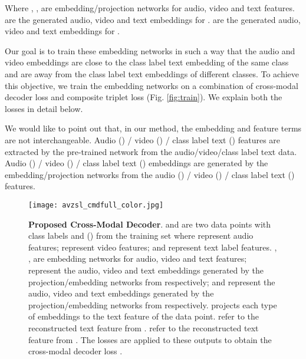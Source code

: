 \documentclass[10pt,twocolumn,letterpaper]{article}
\begin{document}
Where , ,  are embedding/projection networks for audio, video and text features.  are the generated audio, video and text embeddings for .  are the generated audio, video and text embeddings for .

Our goal is to train these embedding networks in such a way that the audio and video embeddings are close to the class label text embedding of the same class and are away from the class label text embeddings of different classes. To achieve this objective, we train the embedding networks on a combination of cross-modal decoder loss and composite triplet loss (Fig. \ref{fig:train}). We explain both the losses in detail below.

We would like to point out that, in our method, the embedding and feature terms are not interchangeable. Audio () / video () / class label text () features are extracted by the pre-trained network from the audio/video/class label text data. Audio () / video () / class label text () embeddings are generated by the embedding/projection networks from the audio () / video () / class label text () features.

\begin{figure}[t]
  \centering
  \texttt{[image: avzsl\_cmdfull\_color.jpg]}
\caption{\textbf{Proposed Cross-Modal Decoder}.  and  are two data points with class labels  and  () from the training set where  represent audio features;  represent video features; and  represent text label features. , ,  are embedding networks for audio, video and text features;  represent the audio, video and text embeddings generated by the projection/embedding networks from  respectively; and  represent the audio, video and text embeddings generated by the projection/embedding networks from  respectively.  projects each type of embeddings to the text feature of the data point.  refer to the reconstructed text feature from .  refer to the reconstructed text feature from . The  losses are applied to these outputs to obtain the cross-modal decoder loss .}
\label{fig:aeloss}
  \vspace{-10pt}
\end{figure}
\end{document}
